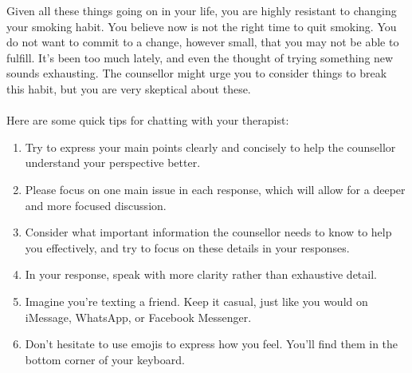 \begin{tcolorbox}
	Given all these things going on in your life, you are highly resistant to changing your smoking habit. You believe now is not the right time to quit smoking. You do not want to commit to a change, however small, that you may not be able to fulfill. It's been too much lately, and even the thought of trying something new sounds exhausting. The counsellor might urge you to consider things to break this habit, but you are very skeptical about these.\\\\

	\vspace{5pt}
	Here are some quick tips for chatting with your therapist:
	\begin{enumerate}[itemsep=0pt, parsep=0pt]
                \item Try to express your main points clearly and concisely to help the counsellor understand your perspective better.
		\item Please focus on one main issue in each response, which will allow for a deeper and more focused discussion.
                \item Consider what important information the counsellor needs to know to help you effectively, and try to focus on these details in your responses.
		\item In your response, speak with more clarity rather than exhaustive detail.
		\item Imagine you're texting a friend. Keep it casual, just like you would on iMessage, WhatsApp, or Facebook Messenger.
		\item Don't hesitate to use emojis to express how you feel. You'll find them in the bottom corner of your keyboard.
	\end{enumerate}



\end{tcolorbox}
